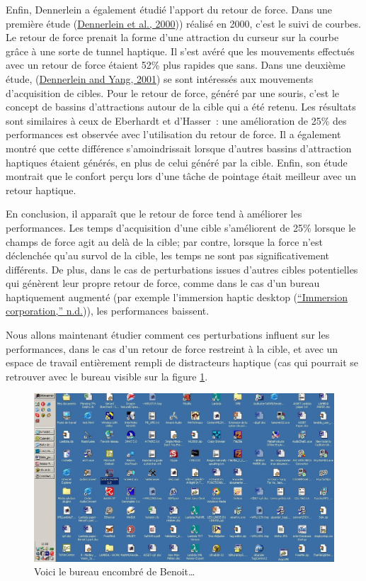\documentclass[
]{book}
\begin{document}
Enfin, Dennerlein a également étudié l'apport du retour de force. Dans une
première étude (\protect\hyperlink{ref-dennerlein2000force}{Dennerlein et al., 2000})) réalisé en 2000, c'est le suivi de
courbes. Le retour de force prenait la forme d'une attraction du curseur sur
la courbe grâce à une sorte de tunnel haptique. Il s'est avéré que les
mouvements effectués avec un retour de force étaient 52\% plus rapides que
sans. Dans une deuxième étude, (\protect\hyperlink{ref-dennerlein2001haptic}{Dennerlein and Yang, 2001}) se sont
intéressés aux mouvements d'acquisition de cibles. Pour le retour de force,
généré par une souris, c'est le concept de bassins d'attractions autour de la
cible qui a été retenu. Les résultats sont similaires à ceux de Eberhardt et
d'Hasser~: une amélioration de 25\% des performances est observée avec
l'utilisation du retour de force. Il a également montré que cette différence
s'amoindrissait lorsque d'autres bassins d'attraction haptiques étaient
générés, en plus de celui généré par la cible. Enfin, son étude montrait que
le confort perçu lors d'une tâche de pointage était meilleur avec un retour
haptique.

En conclusion, il apparaît que le retour de force tend à améliorer les
performances. Les temps d'acquisition d'une cible s'améliorent de 25\% lorsque
le champs de force agit au delà de la cible; par contre, lorsque la force
n'est déclenchée qu'au survol de la cible, les temps ne sont pas
significativement différents. De plus, dans le cas de perturbations issues
d'autres cibles potentielles qui génèrent leur propre retour de force, comme
dans le cas d'un bureau haptiquement augmenté (par exemple l'immersion haptic
desktop (\protect\hyperlink{ref-ImmersionCorporation2005}{{``Immersion corporation,''} n.d.})), les performances baissent.

Nous allons maintenant étudier comment ces perturbations influent sur les
performances, dans le cas d'un retour de force restreint à la cible, et avec
un espace de travail entièrement rempli de distracteurs haptique (cas qui
pourrait se retrouver avec le bureau visible sur la figure \ref{fig:benoit}.

\begin{figure}
\centering
\includegraphics{img/ecran.jpg}
\caption{\label{fig:benoit}Voici le bureau encombré de Benoit\ldots{}}
\end{figure}
\end{document}
